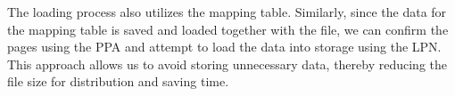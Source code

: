 The loading process also utilizes the mapping table.
Similarly, since the data for the mapping table is saved and loaded together with the file, we can confirm the pages using the PPA and attempt to load the data into storage using the LPN. 
This approach allows us to avoid storing unnecessary data, thereby reducing the file size for distribution and saving time.
